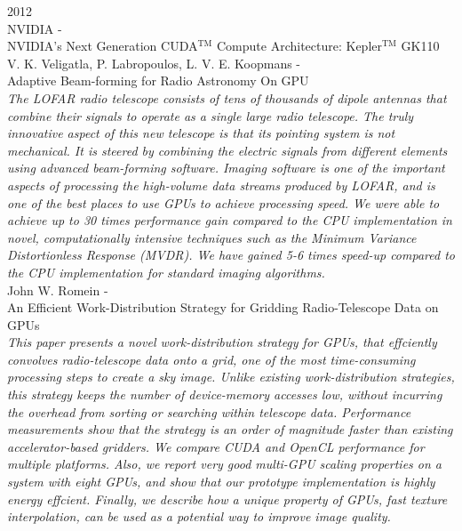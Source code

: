 \noindent
{\large 2012}\\

\noindent
{\large NVIDIA - \hfill \\
NVIDIA’s Next Generation
CUDA$^{\textrm{TM}}$ Compute Architecture: Kepler$^{\textrm{TM}}$ GK110}\\

\noindent
{\large V. K. Veligatla, P. Labropoulos, L. V. E. Koopmans - \hfill \\ Adaptive Beam-forming for Radio Astronomy On GPU }\\
\indent \textit{The LOFAR radio telescope consists of tens of thousands of dipole antennas that combine
their signals to operate as a single large radio telescope. The truly innovative aspect of
this new telescope is that its pointing system is not mechanical. It is steered by combining
the electric signals from different elements using advanced beam-forming software. Imaging
software is one of the important aspects of processing the high-volume data streams
produced by LOFAR, and is one of the best places to use GPUs to achieve processing
speed. We were able to achieve up to 30 times performance gain compared to the CPU
implementation in novel, computationally intensive techniques such as the Minimum Variance
Distortionless Response (MVDR). We have gained 5-6 times speed-up compared to
the CPU implementation for standard imaging algorithms.
}\\

\noindent
{\large John W. Romein - \hfill \\ An Efficient Work-Distribution Strategy for Gridding Radio-Telescope Data on GPUs }\\
\indent \textit{This paper presents a novel work-distribution strategy for GPUs, that effciently convolves radio-telescope data onto a grid, one of the most time-consuming processing steps to
create a sky image. Unlike existing work-distribution strategies, this strategy keeps the number of device-memory accesses low, without incurring the overhead from sorting or searching within telescope data. Performance measurements show that the strategy is an order of magnitude faster than
existing accelerator-based gridders. We compare CUDA and OpenCL performance for multiple platforms. Also, we report very good multi-GPU scaling properties on a system with eight GPUs, and show that our prototype implementation is highly energy effcient. Finally, we describe how a unique property of GPUs, fast texture interpolation, can be used as a potential way to improve image quality.
}\\

